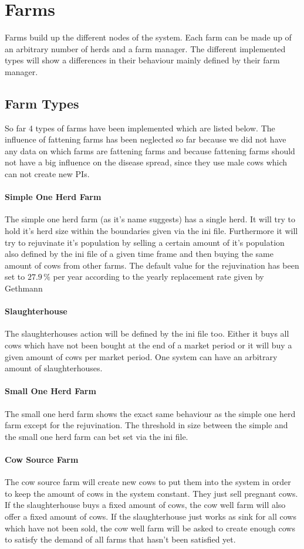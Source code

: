 \section{Farms}
Farms build up the different nodes of the system. Each farm can be made up of an arbitrary number of herds and a farm manager. The different implemented types will show a differences in their behaviour mainly defined by their farm manager.
\subsection{Farm Types}
So far 4 types of farms have been implemented which are listed below. The influence of fattening farms has been neglected so far because we did not have any data on which farms are fattening farms and because fattening farms should not have a big influence on the disease spread, since they use male cows which can not create new PIs.
\paragraph{Simple One Herd Farm}
The simple one herd farm (as it's name suggests) has a single herd. It will try to hold it's herd size within the boundaries given via the ini file. Furthermore it will try to rejuvinate it's population by selling a certain amount of it's population also defined by the ini file of a given time frame and then buying the same amount of cows from other farms. The default value for the rejuvination has been set to $27.9\,\%$ per year according to the yearly replacement rate given by Gethmann
\paragraph{Slaughterhouse}
The slaughterhouses action will be defined by the ini file too. Either it buys all cows which have not been bought at the end of a market period or it will buy a given amount of cows per market period. One system can have an arbitrary amount of slaughterhouses.
\paragraph{Small One Herd Farm}
The small one herd farm shows the exact same behaviour as the simple one herd farm except for the rejuvination. The threshold in size between the simple and the small one herd farm can bet set via the ini file. 
\paragraph{Cow Source Farm}
The cow source farm will create new cows to put them into the system in order to keep the amount of cows in the system constant. They just sell pregnant cows. If the slaughterhouse buys a fixed amount of cows, the cow well farm will also offer a fixed amount of cows. If the slaughterhouse just works as sink for all cows which have not been sold, the cow well farm will be asked to create enough cows to satisfy the demand of all farms that hasn't been satisfied yet.
